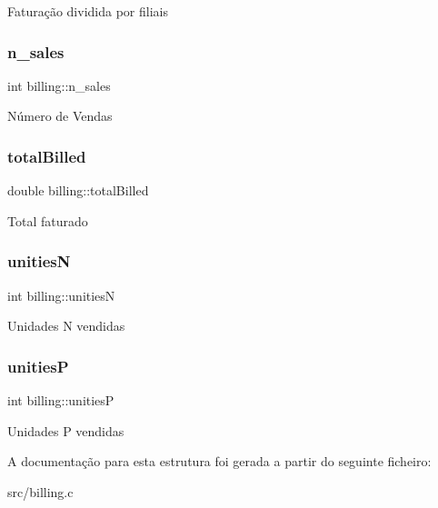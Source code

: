 Faturação dividida por filiais \mbox{\label{structbilling_ab5095dd2fe3537193806daab1f100ad7}} 
\subsubsection{\texorpdfstring{n\+\_\+sales}{n\_sales}}
{\footnotesize\ttfamily int billing\+::n\+\_\+sales}

Número de Vendas \mbox{\label{structbilling_a655490dfe4f0cb58ead51e0daa2adab9}} 
\subsubsection{\texorpdfstring{total\+Billed}{totalBilled}}
{\footnotesize\ttfamily double billing\+::total\+Billed}

Total faturado \mbox{\label{structbilling_ad8370a8b4c4d6511136ae1795fff3ff8}} 
\subsubsection{\texorpdfstring{unitiesN}{unitiesN}}
{\footnotesize\ttfamily int billing\+::unitiesN}

Unidades N vendidas \mbox{\label{structbilling_a981ee24625c7cff0c29f320810eeaf52}} 
\subsubsection{\texorpdfstring{unitiesP}{unitiesP}}
{\footnotesize\ttfamily int billing\+::unitiesP}

Unidades P vendidas 

A documentação para esta estrutura foi gerada a partir do seguinte ficheiro\+:\begin{DoxyCompactItemize}
\item 
src/billing.\+c\end{DoxyCompactItemize}
